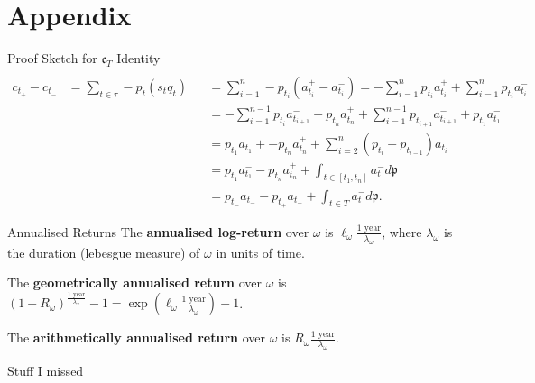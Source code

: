 \documentclass{beamer}
\begin{document}

\section{Appendix}
\begin{frame}{Proof Sketch for $\mathfrak{c}_T$ Identity}
	\begin{align*}
		\\	c_{t_+} - c_{t_-}	&= \sum_{t\in\tau} - p_t (s_t q_t)	&&= \sum_{i=1}^n - p_{t_i} (a_{t_i}^+-a_{t_i}^-) = - \sum_{i=1}^n p_{t_i} a_{t_i}^+ + \sum_{i=1}^n p_{t_i} a_{t_i}^-
		\\				&					&&= - \sum_{i=1}^{n-1} p_{t_i} a_{t_{i+1}}^- - p_{t_n} a_{t_n}^+ + \sum_{i=1}^{n-1} p_{t_{i+1}} a_{t_{i+1}}^- + p_{t_1}a_{t_1}^-
		\\				&					&&= p_{t_1}a_{t_1}^- + - p_{t_n} a_{t_n}^+ + \sum_{i=2}^n (p_{t_i}-p_{t_{i-1}}) a_{t_i}^-
		\\				&					&&= p_{t_1}a_{t_1}^- - p_{t_n}a_{t_n}^+ + \int_{t\in[t_1,t_n]} a_t^- d\mathfrak{p}
		\\				&					&&= p_{t_-}a_{t_-} - p_{t_+}a_{t_+} + \int_{t\in T} a_t^- d\mathfrak{p}.
	\end{align*}
\end{frame}

\begin{frame}{Annualised Returns}
	The \textbf{annualised log-return} over $\omega$ is $\ell_\omega \frac{\textrm{1 year}}{\lambda_\omega}$, where $\lambda_\omega$ is the duration (lebesgue measure) of $\omega$ in units of time.%

	The \textbf{geometrically annualised return} over $\omega$ is $(1 + R_\omega)^\frac{\textrm{1 year}}{\lambda_\omega} - 1 = \exp\left(\ell_\omega \frac{\textrm{1 year}}{\lambda_\omega}\right) - 1$.

	The \textbf{arithmetically annualised return} over $\omega$ is $R_\omega \frac{\textrm{1 year}}{\lambda_\omega}$. %

\end{frame}


\begin{frame}{Stuff I missed}
\end{frame}
\end{document}

